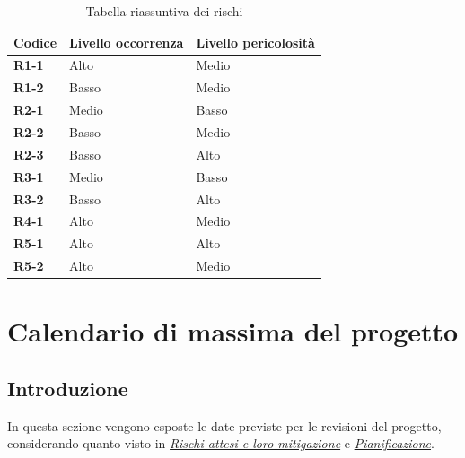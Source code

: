 \documentclass[a4paper,12pt]{article}
\begin{document}
        \begin{table}[H]
        \centering
        \label{tab:riass_rischi}
            \begin{tabular}{|l|l|l|}
            \hline
            \textbf{Codice} & \textbf{Livello occorrenza} & \textbf{Livello pericolosità}\\
            \hline
            \textbf{R1-1} & Alto & Medio \\
            \hline
            \textbf{R1-2} & Basso & Medio \\
            \hline
            \textbf{R2-1} & Medio & Basso \\
            \hline
            \textbf{R2-2} & Basso & Medio \\
            \hline
            \textbf{R2-3} & Basso & Alto \\
            \hline
            \textbf{R3-1} & Medio & Basso \\
            \hline
            \textbf{R3-2} & Basso & Alto \\
            \hline
            \textbf{R4-1} & Alto & Medio \\
            \hline
            \textbf{R5-1} & Alto & Alto \\
            \hline
            \textbf{R5-2} & Alto & Medio \\
            \hline
            \end{tabular}
            \caption{Tabella riassuntiva dei rischi}
        \end{table}

\newpage
\section{Calendario di massima del progetto}
    \subsection{Introduzione}
        In questa sezione vengono esposte le date previste per le revisioni del progetto, considerando quanto visto in \href{sec:rischi}{\textit{Rischi attesi e loro mitigazione}} e \href{sec:pianificazione}{\textit{Pianificazione}}.
\end{document}
